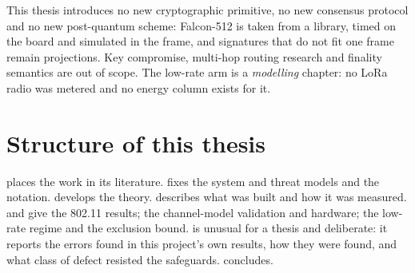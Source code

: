 This thesis introduces no new cryptographic primitive, no new consensus protocol and no new
post-quantum scheme: Falcon-512 is taken from a library, timed on the board and simulated in the
frame, and signatures that do not fit one frame remain projections. Key
compromise, multi-hop routing research and finality semantics are out of scope. The low-rate arm is
a \emph{modelling} chapter: no LoRa radio was metered and no energy column exists for it.

\section{Structure of this thesis}

 places the work in its literature.  fixes the system and
threat models and the notation.  develops the theory. 
describes what was built and  how it was measured.  and
 give the 802.11 results;  the channel-model validation and
hardware;  the low-rate regime and the exclusion bound.
 is unusual for a thesis and deliberate: it reports the errors found in
this project's own results, how they were found, and what class of defect resisted the safeguards.
 concludes.
